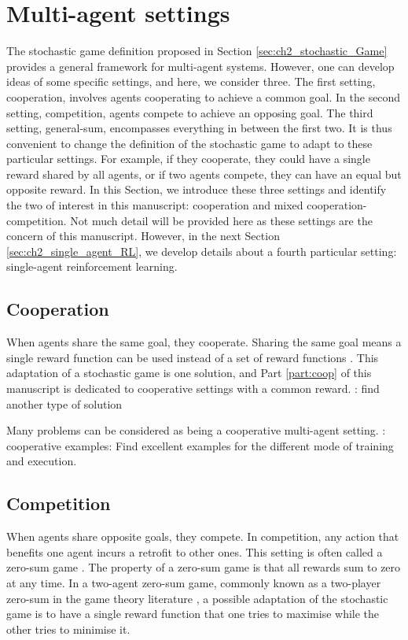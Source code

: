 \section{Multi-agent settings} 
\label{sec:ch2_multi_agent_settings}
The stochastic game definition proposed in Section \ref{sec:ch2_stochastic_Game} provides a general framework for multi-agent systems.
However, one can develop ideas of some specific settings, and here, we consider three.
The first setting, cooperation, involves agents cooperating to achieve a common goal.
In the second setting, competition, agents compete to achieve an opposing goal.
The third setting, general-sum, encompasses everything in between the first two.
It is thus convenient to change the definition of the stochastic game to adapt to these particular settings.
For example, if they cooperate, they could have a single reward shared by all agents, or if two agents compete, they can have an equal but opposite reward.
In this Section, we introduce these three settings and identify the two of interest in this manuscript: cooperation and mixed cooperation-competition.
Not much detail will be provided here as these settings are the concern of this manuscript.
However, in the next Section \ref{sec:ch2_single_agent_RL}, we develop details about a fourth particular setting: single-agent reinforcement learning.

\subsection{Cooperation} 
\label{sec:ch2_Cooperation}
When agents share the same goal, they cooperate.
Sharing the same goal means a single reward function can be used instead of a set of reward functions \citep{}.
This adaptation of a stochastic game is one solution, and Part \ref{part:coop} of this manuscript is dedicated to cooperative settings with a common reward.
\todo: find another type of solution

Many problems can be considered as being a cooperative multi-agent setting.
\todo: cooperative examples: Find excellent examples for the different mode of training and execution.

\subsection{Competition} 
\label{sec:ch2_Competition}
When agents share opposite goals, they compete.
In competition, any action that benefits one agent incurs a retrofit to other ones.
This setting is often called a zero-sum game \citep{}.
The property of a zero-sum game is that all rewards sum to zero at any time.
In a two-agent zero-sum game, commonly known as a two-player zero-sum in the game theory literature \citep{}, a possible adaptation of the stochastic game is to have a single reward function that one tries to maximise while the other tries to minimise it.

